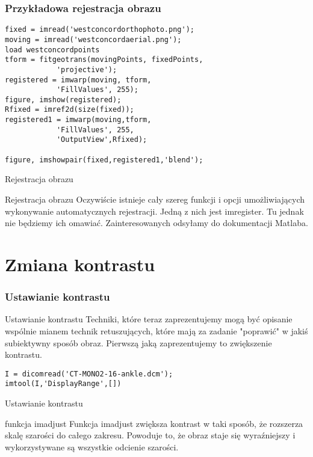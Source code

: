 \documentclass{beamer}
\begin{document}
\begin{frame}[fragile]
\frametitle{Przykładowa rejestracja obrazu}
\begin{example}
\begin{lstlisting}
fixed = imread('westconcordorthophoto.png');
moving = imread('westconcordaerial.png');
load westconcordpoints
tform = fitgeotrans(movingPoints, fixedPoints, 
			'projective');
registered = imwarp(moving, tform,
			'FillValues', 255);
figure, imshow(registered);
Rfixed = imref2d(size(fixed));
registered1 = imwarp(moving,tform,
			'FillValues', 255,
			'OutputView',Rfixed);
				
figure, imshowpair(fixed,registered1,'blend');
\end{lstlisting}
\end{example}

\end{frame}

\begin{frame}{Rejestracja obrazu}
\begin{block}{Rejestracja obrazu}
Oczywiście istnieje cały szereg funkcji i opcji umożliwiających wykonywanie automatycznych rejestracji. Jedną z nich jest imregister. Tu jednak nie będziemy ich omawiać. Zainteresowanych odsyłamy do dokumentacji Matlaba.
\end{block}
\end{frame}

\section{Zmiana kontrastu}

\begin{frame}[fragile]
\frametitle{Ustawianie kontrastu}
\begin{block}{Ustawianie kontrastu}
Techniki, które teraz zaprezentujemy mogą być opisanie wspólnie mianem technik retuszujących, które mają za zadanie "poprawić" w jakiś subiektywny sposób obraz. Pierwszą jaką zaprezentujemy to zwiększenie kontrastu.
\end{block}

\begin{example}
\begin{lstlisting}
I = dicomread('CT-MONO2-16-ankle.dcm');
imtool(I,'DisplayRange',[])
\end{lstlisting}
\end{example}

\end{frame}

\begin{frame}{Ustawianie kontrastu}
\begin{block}{funkcja imadjust}
Funkcja imadjust zwiększa kontrast w taki sposób, że rozszerza skalę szarości do całego zakresu. Powoduje to, że obraz staje się wyraźniejszy i wykorzystywane są wszystkie odcienie szarości.
\end{block}
\end{frame}
\end{document}
